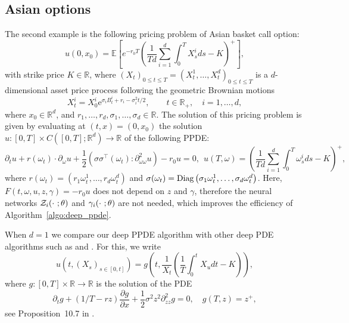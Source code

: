 \documentclass[12pt]{article}
\numberwithin{equation}{section}
\newcommand{\re}{\mathrm{e}}
\newcommand{\E}{\mathbb{E}}
\newcommand{\real}{\mathbb{R}}
\def\diag{\mathop{\hbox{\rm Diag}}\nolimits}
\let\oldcitet=\citet
\renewcommand{\cite}[1]{\textcolor[rgb]{0,0,1}{\oldcitet{#1}}}
\renewcommand{\citet}[1]{\textcolor[rgb]{0,0,1}{\oldcitet{#1}}}
\begin{document}
\subsection{Asian options}
\label{jklds}
The second example is the following pricing problem of Asian basket call option:
\begin{equation}
\nonumber %
    u(0, x_0) = \E \left[ e^{-r_0T} \left(\frac{1}{Td}\sum\limits_{i = 1}^d  \int_0^T X^i_s ds - K \right)^+ \right],
\end{equation}
with strike price $K \in \real$, where
 $(X_t)_{0 \leq t \leq T} = (X^1_t, \dots, X^d_t)_{0 \leq t \leq T}$
is a $d$-dimensional asset price process following
the geometric Brownian motions
\begin{equation}
  \label{gbm}
X_t^i = X_0^i \re^{\sigma_iB_t^i + r_i -\sigma_i^2t/2}, \qquad
t\in \real_+, \quad i = 1,\ldots , d,
\end{equation}
where $x_0 \in \real^d$,
and $r_1, \ldots, r_d, \sigma_1, \ldots, \sigma_d \in \real$.
The solution of this pricing problem is given by
evaluating at $(t,x)=(0, x_0)$
the solution $u:[0,T] \times C\left([0,T]; \real^d\right) \rightarrow \real$
 of the following PPDE:
\begin{equation}
\nonumber %
    \partial_t u + r(\omega_t) \cdot \partial_\omega u
    + \frac{1}{2} \left( \sigma\sigma^\top  (\omega_t)  : \partial^2_{\omega\omega}u \right) - r_0u = 0,
    \ \ u(T, \omega) = \left( \frac{1}{Td}\sum\limits_{i = 1}^d  \int_0^T \omega^i_s ds - K \right)^+,
\end{equation}
 where $r(\omega_t) = \left(r_1\omega^1_t, \ldots, r_d\omega^d_t\right)$ and
 $\sigma(\omega_t) = \diag \left(\sigma_1\omega^1_t, \ldots, \sigma_d\omega^d_t\right)$.
 Here, $F(t, \omega, u, z, \gamma) = -r_0 u$ does not depend on
 $z$ and $\gamma$, therefore
the neural networks ${\cal Z}_i(\cdot \ ;\theta)$ and
${\cal \gamma}_i(\cdot \ ;\theta)$
 are not needed, %
 which improves the efficiency of Algorithm~\ref{algo:deep_ppde}.

\medskip

 When $d=1$ we compare our deep PPDE algorithm
 with other deep PDE algorithms such as
 \cite{han2018solving} and \cite{beck2019deep}.
 For this, we write
 $$
 u(t, (X_s)_{s \in [0,t]} ) = g\left(t, \frac{1}{X_t} \left(\frac{1}{T} \int_0^t X_u dt - K\right)\right),
 $$
 where $g:[0,T] \times \real \rightarrow \real$ is the solution of
 the \cite{rogersshi} PDE
 \begin{equation}
   \partial_t g +  (1/T - rz) \frac{\partial g}{\partial x}
    + \frac{1}{2} \sigma^2 z^2 \partial^2_{zz}g = 0, \quad g(T, z) = z^+,
\end{equation}
 see Proposition~10.7 in \cite{privaultbkf}.
\end{document}
